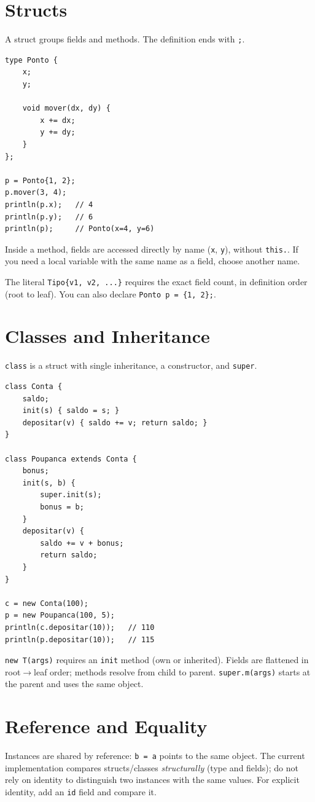 \documentclass[11pt,a4paper,oneside]{report}
\newcommand{\code}[1]{\texttt{#1}}
\begin{document}
\section{Structs}
A struct groups fields and methods. The definition ends with \code{;}.

\begin{lstlisting}
type Ponto {
    x;
    y;

    void mover(dx, dy) {
        x += dx;
        y += dy;
    }
};

p = Ponto{1, 2};
p.mover(3, 4);
println(p.x);   // 4
println(p.y);   // 6
println(p);     // Ponto(x=4, y=6)
\end{lstlisting}

Inside a method, fields are accessed directly by name (\code{x},
\code{y}), without \code{this.}. If you need a local variable with the
same name as a field, choose another name.

The literal \code{Tipo\{v1, v2, ...\}} requires the exact field count, in
definition order (root to leaf). You can also declare
\code{Ponto p = \{1, 2\};}.

\section{Classes and Inheritance}
\code{class} is a struct with single inheritance, a constructor, and
\code{super}.

\begin{lstlisting}
class Conta {
    saldo;
    init(s) { saldo = s; }
    depositar(v) { saldo += v; return saldo; }
}

class Poupanca extends Conta {
    bonus;
    init(s, b) {
        super.init(s);
        bonus = b;
    }
    depositar(v) {
        saldo += v + bonus;
        return saldo;
    }
}

c = new Conta(100);
p = new Poupanca(100, 5);
println(c.depositar(10));   // 110
println(p.depositar(10));   // 115
\end{lstlisting}

\code{new T(args)} requires an \code{init} method (own or inherited).
Fields are flattened in root$\rightarrow$leaf order; methods resolve from
child to parent. \code{super.m(args)} starts at the parent and uses the
same object.

\section{Reference and Equality}
Instances are shared by reference: \code{b = a} points to the same
object. The current implementation compares structs/classes
\emph{structurally} (type and fields); do not rely on identity to
distinguish two instances with the same values. For explicit identity,
add an \code{id} field and compare it.
\end{document}

